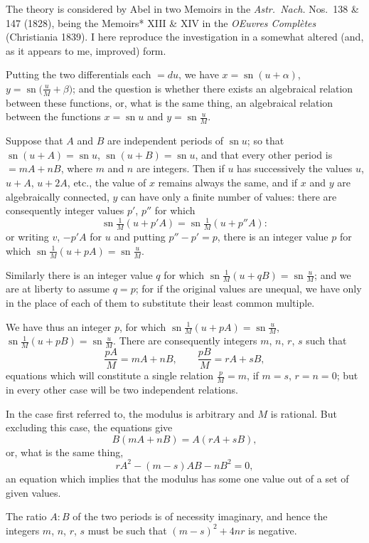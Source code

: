 \documentclass[11pt,a4paper]{article}
\theoremstyle{plain}
\theoremstyle{definition}
\DeclareMathOperator{\sn}{sn}
\begin{document}
The theory is considered by Abel in two Memoirs in the \emph{Astr.~Nach.} Nos.~138 \& 147 (1828), being the Memoirs* XIII \& XIV in the \emph{OEuvres Compl\`etes} (Christiania 1839). I here reproduce the investigation in a somewhat altered (and, as it appears to me, improved) form.

Putting the two differentials each $= du$, we have $x = \sn(u + \alpha)$, $y = \sn\bigl(\frac{u}{M} + \beta\bigr)$; and the question is whether there exists an algebraical relation between these functions, or, what is the same thing, an algebraical relation between the functions $x = \sn u$ and $y = \sn\frac{u}{M}$.

Suppose that $A$ and $B$ are independent periods of $\sn u$; so that $\sn(u + A) = \sn u$, $\sn(u + B) = \sn u$, and that every other period is $= mA + nB$, where $m$ and $n$ are integers. Then if $u$ has successively the values $u$, $u + A$, $u + 2A$, etc., the value of $x$ remains always the same, and if $x$ and $y$ are algebraically connected, $y$ can have only a finite number of values: there are consequently integer values $p'$, $p''$ for which
\[
\sn\tfrac{1}{M}(u + p'A) = \sn\tfrac{1}{M}(u + p''A):
\]
or writing $v$, $-p'A$ for $u$ and putting $p'' - p' = p$, there is an integer value $p$ for which $\sn\frac{1}{M}(u + pA) = \sn\frac{u}{M}$.

Similarly there is an integer value $q$ for which $\sn\frac{1}{M}(u + qB) = \sn\frac{u}{M}$; and we are at liberty to assume $q = p$; for if the original values are unequal, we have only in the place of each of them to substitute their least common multiple.

We have thus an integer $p$, for which $\sn\frac{1}{M}(u + pA) = \sn\frac{u}{M}$, $\sn\frac{1}{M}(u + pB) = \sn\frac{u}{M}$. There are consequently integers $m$, $n$, $r$, $s$ such that
\[
\frac{pA}{M} = mA + nB, \qquad \frac{pB}{M} = rA + sB,
\]
equations which will constitute a single relation $\frac{p}{M} = m$, if $m = s$, $r = n = 0$; but in every other case will be two independent relations.

In the case first referred to, the modulus is arbitrary and $M$ is rational. But excluding this case, the equations give
\[
B(mA + nB) = A(rA + sB),
\]
or, what is the same thing,
\[
rA^2 - (m - s)AB - nB^2 = 0,
\]
an equation which implies that the modulus has some one value out of a set of given values.

The ratio $A : B$ of the two periods is of necessity imaginary, and hence the integers $m$, $n$, $r$, $s$ must be such that $(m - s)^2 + 4nr$ is negative.
\end{document}
